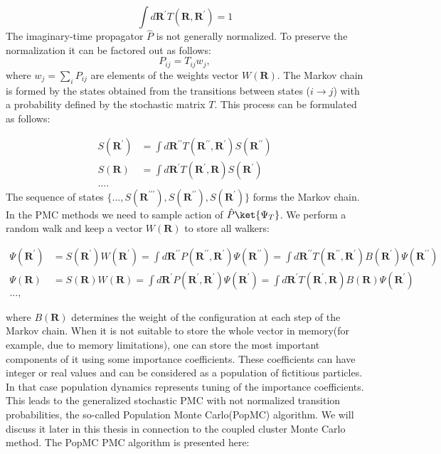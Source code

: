 \documentclass[twoside,english]{uiofysmaster}
\begin{document}
\begin{equation}
\int d\boldsymbol{R}^\prime T(\boldsymbol{R}, \boldsymbol{R}^\prime) = 1
\end{equation}
The imaginary-time propagator $\hat{P}$ is not generally normalized. To preserve the normalization it can be factored out as follows:
\begin{equation}
P_{ij} = T_{ij}w_j,
\end{equation}
where $w_j = \sum_i P_{ij}$ are elements of the weights vector
$W(\boldsymbol{R})$.  The Markov chain is formed by the states
obtained from the transitions between states ($i \rightarrow j$) with
a probability defined by the stochastic matrix $T$. This process can
be formulated as follows:

\begin{align*}
S(\boldsymbol{R}^\prime)  &= \int d\boldsymbol{R}^{\prime\prime} T(\boldsymbol{R^{\prime\prime}}, \boldsymbol{R}^\prime) S(\boldsymbol{R}^{\prime\prime})\\
S(\boldsymbol{R}) &= \int d\boldsymbol{R}^\prime T(\boldsymbol{R^\prime}, \boldsymbol{R}) S(\boldsymbol{R}^{\prime})\\
\dots.
\end{align*}
The sequence of states $\{\dots
,S(\boldsymbol{R}^{\prime\prime\prime})
,S(\boldsymbol{R}^{\prime\prime}), S(\boldsymbol{R}^\prime)\}$ forms
the Markov chain. In the PMC methods we need to sample action of
$\hat{P}\ket{\Psi_T}$. We perform a random walk and keep a vector
$W(\boldsymbol{R})$ to store all walkers:

\begin{align*}
\Psi(\boldsymbol{R}^\prime)  &= S(\boldsymbol{R}^{\prime})W(\boldsymbol{R}^{\prime}) = \int d\boldsymbol{R}^{\prime\prime} P(\boldsymbol{R^{\prime\prime}}, \boldsymbol{R}^\prime) \Psi(\boldsymbol{R}^{\prime\prime}) = \int d\boldsymbol{R}^{\prime\prime} T(\boldsymbol{R^{\prime\prime}}, \boldsymbol{R}^\prime) B(\boldsymbol{R}^{\prime}) \Psi(\boldsymbol{R}^{\prime\prime})\\
\Psi(\boldsymbol{R})  &= S(\boldsymbol{R})W(\boldsymbol{R}) = \int d\boldsymbol{R}^{\prime} P(\boldsymbol{R^{\prime}}, \boldsymbol{R}^\prime) \Psi(\boldsymbol{R}^{\prime}) = \int d\boldsymbol{R}^{\prime} T(\boldsymbol{R^{\prime}}, \boldsymbol{R}) B(\boldsymbol{R}) \Psi(\boldsymbol{R}^{\prime})\\
\dots ,
\end{align*}

where $B(\boldsymbol{R})$ determines the weight of the configuration
at each step of the Markov chain. When it is not suitable to store the
whole vector in memory(for example, due to memory limitations), one
can store the most important components of it using some importance
coefficients. These coefficients can have integer or real values and
can be considered as a population of fictitious particles. In that
case population dynamics represents tuning of the importance
coefficients. This leads to the generalized stochastic PMC with not
normalized transition probabilities, the  so-called Population Monte
Carlo(PopMC) algorithm. We will discuss it later in this thesis in
connection to the coupled cluster Monte Carlo method. The PopMC PMC
algorithm is presented here:
\end{document}
